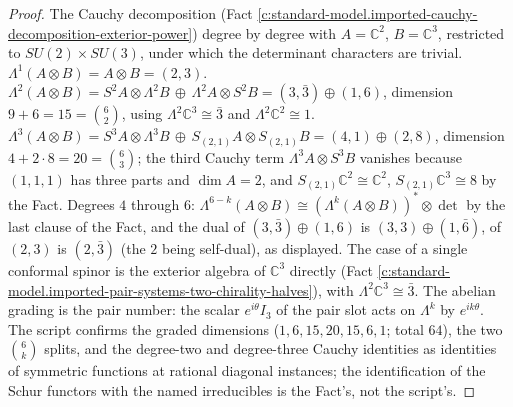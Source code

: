 \documentclass[11pt]{article}
\theoremstyle{definition}
\theoremstyle{plain}
\providecommand{\C}{}\renewcommand{\C}{\mathbb{C}}
\begin{document}
\begin{proof}
The Cauchy decomposition (Fact \ref{c:standard-model.imported-cauchy-decomposition-exterior-power}) degree by degree with $A = \C^{2}$, $B = \C^{3}$, restricted to $SU(2) \times SU(3)$, under which the determinant characters are trivial. $\Lambda^{1}(A \otimes B) = A \otimes B = (2,3)$. $\Lambda^{2}(A \otimes B) = S^{2}A \otimes \Lambda^{2}B \,\oplus\, \Lambda^{2}A \otimes S^{2}B = (3, \bar{3}) \oplus (1, 6)$, dimension $9 + 6 = 15 = \binom{6}{2}$, using $\Lambda^{2}\C^{3} \cong \bar{3}$ and $\Lambda^{2}\C^{2} \cong 1$. $\Lambda^{3}(A \otimes B) = S^{3}A \otimes \Lambda^{3}B \,\oplus\, S_{(2,1)}A \otimes S_{(2,1)}B = (4, 1) \oplus (2, 8)$, dimension $4 + 2\cdot 8 = 20 = \binom{6}{3}$; the third Cauchy term $\Lambda^{3}A \otimes S^{3}B$ vanishes because $(1,1,1)$ has three parts and $\dim A = 2$, and $S_{(2,1)}\C^{2} \cong \C^{2}$, $S_{(2,1)}\C^{3} \cong 8$ by the Fact. Degrees $4$ through $6$: $\Lambda^{6-k}(A \otimes B) \cong (\Lambda^{k}(A \otimes B))^{*} \otimes \det$ by the last clause of the Fact, and the dual of $(3, \bar{3}) \oplus (1, 6)$ is $(3, 3) \oplus (1, \bar{6})$, of $(2, 3)$ is $(2, \bar{3})$ (the $2$ being self-dual), as displayed. The case of a single conformal spinor is the exterior algebra of $\C^{3}$ directly (Fact \ref{c:standard-model.imported-pair-systems-two-chirality-halves}), with $\Lambda^{2}\C^{3} \cong \bar{3}$. The abelian grading is the pair number: the scalar $e^{i\theta}I_{3}$ of the pair slot acts on $\Lambda^{k}$ by $e^{ik\theta}$. The script confirms the graded dimensions ($1, 6, 15, 20, 15, 6, 1$; total $64$), the two $\binom{6}{k}$ splits, and the degree-two and degree-three Cauchy identities as identities of symmetric functions at rational diagonal instances; the identification of the Schur functors with the named irreducibles is the Fact's, not the script's.

\end{proof}
\end{document}
